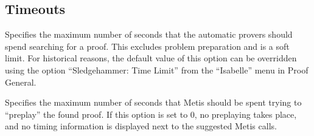 \documentclass[a4paper,12pt]{article}
\begin{document}
\subsection{Timeouts}
\label{timeouts}

\begin{enum}
Specifies the maximum number of seconds that the automatic provers should spend
searching for a proof. This excludes problem preparation and is a soft limit.
For historical reasons, the default value of this option can be overridden using
the option ``Sledgehammer: Time Limit'' from the ``Isabelle'' menu in Proof
General.

Specifies the maximum number of seconds that Metis should be spent trying to
``preplay'' the found proof. If this option is set to 0, no preplaying takes
place, and no timing information is displayed next to the suggested Metis calls.
\end{enum}

\let\em=\sl
{}

\end{document}
